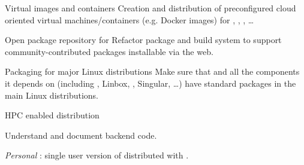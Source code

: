 \begin{workpackage}[id=component-architecture,wphases=0-48!.5,
  title=Component Architecture,lead=UV,
  PSRM=24,UVRM=8,SARM=16, USHRM=4]
\begin{wpdelivs}
    \begin{wpdeliv}[due=6,id=virtual-machines,dissem=PU,nature=OTHER]
      {Virtual images and containers} Creation and distribution of
      preconfigured cloud oriented virtual machines/containers
      (e.g. Docker images) for \PariGP, \Sage, \SMC, \dots
    \end{wpdeliv}

    \begin{wpdeliv}[due=24,id=sage-repository,dissem=PU,nature=OTHER]
      {Open package repository for \Sage} Refactor \Sage package and
      build system to support community-contributed packages
      installable via the web.
    \end{wpdeliv}

    \begin{wpdeliv}[due=48,id=sage-distribution,dissem=PU,nature=OTHER]
      {Packaging for major Linux distributions} Make sure that \Sage and
      all the components it depends on (including \GAP,
      Linbox, \PariGP, Singular, \dots) have standard packages in the
      main Linux distributions.
    \end{wpdeliv}


    \begin{wpdeliv}[due=48,id=hpc-configure,dissem=PU,nature=OTHER]
      {HPC enabled \Sage distribution}
    \end{wpdeliv}

    \begin{wpdeliv}[due=6,id=smc-documentation,dissem=PU,nature=R]
      {Understand and document \SMC backend code.}
    \end{wpdeliv}%

    \begin{wpdeliv}[due=24,id=personal-smc,dissem=PU,nature=OTHER]
      {\emph{Personal} \SMC: single user version of \SMC distributed
        with \Sage.}
    \end{wpdeliv}%


\end{wpdelivs}
\end{workpackage}

